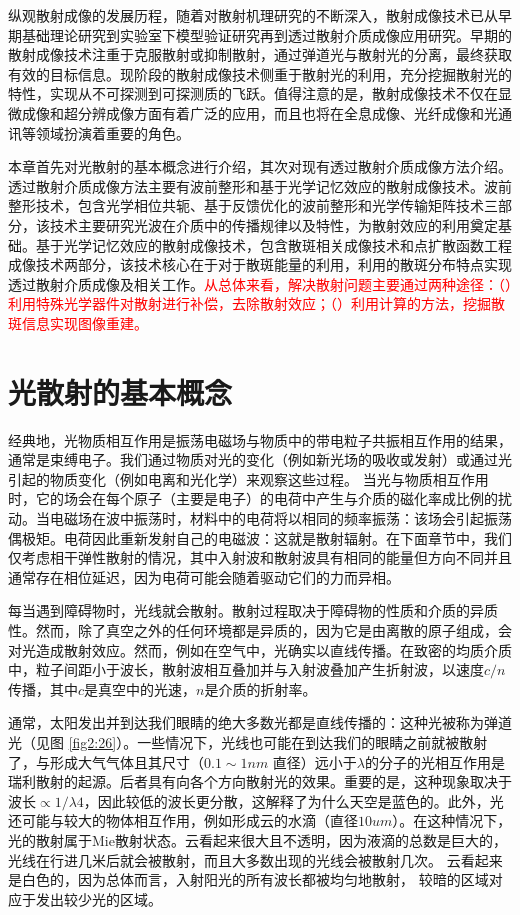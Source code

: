 纵观散射成像的发展历程，随着对散射机理研究的不断深入，散射成像技术已从早期基础理论研究到实验室下模型验证研究再到透过散射介质成像应用研究。早期的散射成像技术注重于克服散射或抑制散射，通过弹道光与散射光的分离，最终获取有效的目标信息。现阶段的散射成像技术侧重于散射光的利用，充分挖掘散射光的特性，实现从不可探测到可探测质的飞跃。值得注意的是，散射成像技术不仅在显微成像和超分辨成像方面有着广泛的应用，而且也将在全息成像、光纤成像和光通讯等领域扮演着重要的角色。

本章首先对光散射的基本概念进行介绍，其次对现有透过散射介质成像方法介绍。
透过散射介质成像方法主要有波前整形和基于光学记忆效应的散射成像技术。波前整形技术，包含光学相位共轭、基于反馈优化的波前整形和光学传输矩阵技术三部分，该技术主要研究光波在介质中的传播规律以及特性，为散射效应的利用奠定基础。基于光学记忆效应的散射成像技术，包含散斑相关成像技术和点扩散函数工程成像技术两部分，该技术核心在于对于散斑能量的利用，利用的散斑分布特点实现透过散射介质成像及相关工作。\textcolor{red}{从总体来看，解决散射问题主要通过两种途径：（）利用特殊光学器件对散射进行补偿，去除散射效应；（）利用计算的方法，挖掘散斑信息实现图像重建。}

\section{光散射的基本概念}

经典地，光物质相互作用是振荡电磁场与物质中的带电粒子共振相互作用的结果，通常是束缚电子。我们通过物质对光的变化（例如新光场的吸收或发射）或通过光引起的物质变化（例如电离和光化学）来观察这些过程。
当光与物质相互作用时，它的场会在每个原子（主要是电子）的电荷中产生与介质的磁化率成比例的扰动。当电磁场在波中振荡时，材料中的电荷将以相同的频率振荡：该场会引起振荡偶极矩。电荷因此重新发射自己的电磁波：这就是散射辐射。在下面章节中，我们仅考虑相干弹性散射的情况，其中入射波和散射波具有相同的能量但方向不同并且通常存在相位延迟，因为电荷可能会随着驱动它们的力而异相。

每当遇到障碍物时，光线就会散射。散射过程取决于障碍物的性质和介质的异质性。然而，除了真空之外的任何环境都是异质的，因为它是由离散的原子组成，会对光造成散射效应。然而，例如在空气中，光确实以直线传播。在致密的均质介质中，粒子间距小于波长，散射波相互叠加并与入射波叠加产生折射波，以速度$c/n$传播，其中$c$是真空中的光速，$n$是介质的折射率\cite{bohren_absorption_2008}。

通常，太阳发出并到达我们眼睛的绝大多数光都是直线传播的：这种光被称为弹道光（见图 \ref{fig2:26}）。一些情况下，光线也可能在到达我们的眼睛之前就被散射了，与形成大气气体且其尺寸（$0.1 \sim 1 nm$ 直径）远小于$\lambda$的分子的光相互作用是瑞利散射的起源。后者具有向各个方向散射光的效果。重要的是，这种现象取决于波长$\propto 1/ \lambda 4$，因此较低的波长更分散，这解释了为什么天空是蓝色的。此外，光还可能与较大的物体相互作用，例如形成云的水滴（直径$10 um$）。在这种情况下，光的散射属于Mie散射状态。云看起来很大且不透明，因为液滴的总数是巨大的，光线在行进几米后就会被散射，而且大多数出现的光线会被散射几次。 云看起来是白色的，因为总体而言，入射阳光的所有波长都被均匀地散射， 较暗的区域对应于发出较少光的区域。

